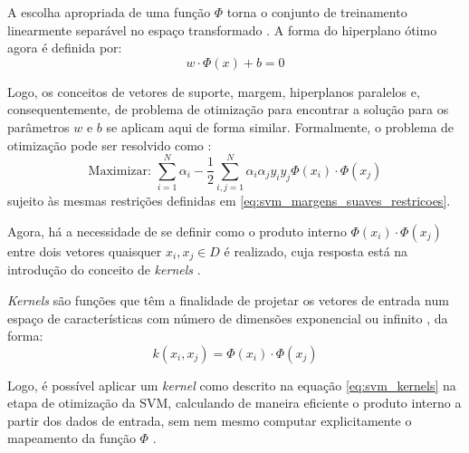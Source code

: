 A escolha apropriada de uma função $\Phi$ torna o conjunto de treinamento linearmente separável no espaço transformado \citep{lorena:03}. A forma do hiperplano ótimo agora é definida por:
\begin{equation}
\label{eq:svm_hyperplano_otimo_trasnformado}
w \cdot \Phi(x) + b = 0
\end{equation}

Logo, os conceitos de vetores de suporte, margem, hiperplanos paralelos e, consequentemente, de problema de otimização para encontrar a solução para os parâmetros $w$ e $b$ se aplicam aqui de forma similar. Formalmente, o problema de otimização pode ser resolvido como \citep{lorena:03}:
\begin{equation}
\label{eq:svm_nao_linear}
\text{Maximizar: } \sum_{i=1}^N \alpha_i - \frac{1}{2} \sum_{i, j=1}^N \alpha_i \alpha_j y_i y_j \Phi(x_i)\cdot \Phi(x_j)
\end{equation}
\noindent sujeito às mesmas restrições definidas em \ref{eq:svm_margens_suaves_restricoes}.

Agora, há a necessidade de se definir como o produto interno $\Phi(x_i)\cdot \Phi(x_j)$ entre dois vetores quaisquer $x_i, x_j \in D$ é realizado, cuja resposta está na introdução do conceito de \emph{kernels} \citep{lorena:03}.

\emph{Kernels} são funções que têm a finalidade de projetar os vetores de entrada num espaço de características com número de dimensões exponencial ou infinito \citep{taylor:04}, da forma:
\begin{equation}
\label{eq:svm_kernels}
k(x_i, x_j) =  \Phi(x_i) \cdot \Phi(x_j)
\end{equation}

Logo, é possível aplicar um \emph{kernel} como descrito na equação \ref{eq:svm_kernels} na etapa de otimização da SVM, calculando de maneira eficiente o produto interno a partir dos dados de entrada, sem nem mesmo computar explicitamente o mapeamento da função $\Phi$ \citep{taylor:04}.

